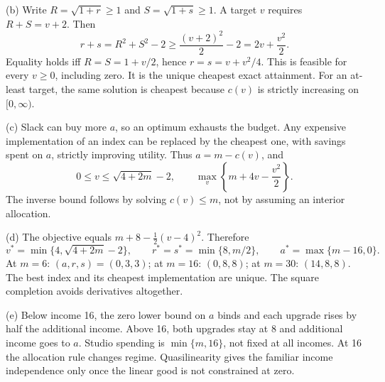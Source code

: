 \documentclass[11pt,a4paper]{article}
\begin{document}
(b) Write $R=\sqrt{1+r}\ge1$ and $S=\sqrt{1+s}\ge1$. A target $v$ requires $R+S=v+2$. Then
\[
 r+s=R^2+S^2-2\ge\frac{(v+2)^2}{2}-2=2v+\frac{v^2}{2}.
\]
Equality holds iff $R=S=1+v/2$, hence $r=s=v+v^2/4$. This is feasible for every $v\ge0$, including zero. It is the unique cheapest exact attainment. For an at-least target, the same solution is cheapest because $c(v)$ is strictly increasing on $[0,\infty)$.

(c) Slack can buy more $a$, so an optimum exhausts the budget. Any expensive implementation of an index can be replaced by the cheapest one, with savings spent on $a$, strictly improving utility. Thus $a=m-c(v)$, and
\[
 0\le v\le\sqrt{4+2m}-2,\qquad
 \max_v\left\{m+4v-\frac{v^2}{2}\right\}.
\]
The inverse bound follows by solving $c(v)\le m$, not by assuming an interior allocation.

(d) The objective equals $m+8-\tfrac12(v-4)^2$. Therefore
\[
 v^*=\min\{4,\sqrt{4+2m}-2\},\qquad
 r^*=s^*=\min\{8,m/2\},\qquad a^*=\max\{m-16,0\}.
\]
At $m=6$: $(a,r,s)=(0,3,3)$; at $m=16$: $(0,8,8)$; at $m=30$: $(14,8,8)$. The best index and its cheapest implementation are unique. The square completion avoids derivatives altogether.

(e) Below income 16, the zero lower bound on $a$ binds and each upgrade rises by half the additional income. Above 16, both upgrades stay at 8 and additional income goes to $a$. Studio spending is $\min\{m,16\}$, not fixed at all incomes. At 16 the allocation rule changes regime. Quasilinearity gives the familiar income independence only once the linear good is not constrained at zero.
\end{document}
